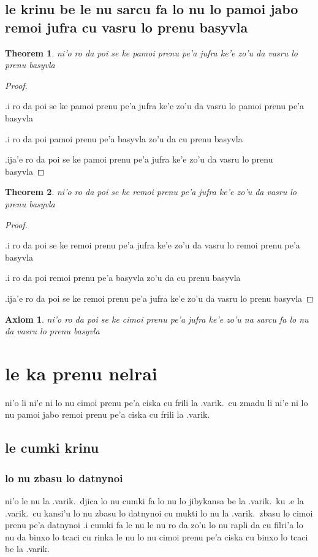 \documentclass{article}
\newtheorem{thm}{Theorem}
\newtheorem{axiom}{Axiom}
\begin{document}
\subsection{le krinu be le nu sarcu fa lo nu lo pamoi jabo remoi jufra cu vasru lo prenu basyvla}
\begin{thm}
	ni'o ro da poi se ke pamoi prenu pe'a jufra ke'e zo'u da vasru lo prenu basyvla
\end{thm}
\begin{proof}
	${}$

	.i ro da poi se ke pamoi prenu pe'a jufra ke'e zo'u da vasru lo pamoi prenu pe'a basyvla

	.i ro da poi pamoi prenu pe'a basyvla zo'u da cu prenu basyvla

	.ija'e ro da poi se ke pamoi prenu pe'a jufra ke'e zo'u da vasru lo prenu basyvla
\end{proof}
\begin{thm}
	ni'o ro da poi se ke remoi prenu pe'a jufra ke'e zo'u da vasru lo prenu basyvla
\end{thm}
\begin{proof}
	${ }$

	.i ro da poi se ke remoi prenu pe'a jufra ke'e zo'u da vasru lo remoi prenu pe'a basyvla

	.i ro da poi remoi prenu pe'a basyvla zo'u da cu prenu basyvla

	.ija'e ro da poi se ke remoi prenu pe'a jufra ke'e zo'u da vasru lo prenu basyvla
\end{proof}
\begin{axiom}
	ni'o ro da poi se ke cimoi prenu pe'a jufra ke'e zo'u na sarcu fa lo nu da vasru lo prenu basyvla
\end{axiom}

\section{le ka prenu nelrai}
ni'o li ni'e ni lo nu cimoi prenu pe'a ciska cu frili la .varik.\ cu zmadu li ni'e ni lo nu pamoi jabo remoi prenu pe'a ciska cu frili la .varik.

\subsection{le cumki krinu}

\subsubsection{lo nu zbasu lo datnynoi}
ni'o le nu la .varik.\ djica lo nu cumki fa lo nu lo jibykansa be la .varik.\ ku .e la .varik.\ cu kansi'u lo nu zbasu lo datnynoi cu mukti lo nu la .varik.\ zbasu lo cimoi prenu pe'a datnynoi  .i cumki fa le nu le nu ro da zo'u lo nu rapli da cu filri'a lo nu da binxo lo tcaci cu rinka le nu lo nu cimoi prenu pe'a ciska cu binxo lo tcaci be la .varik.
\end{document}
